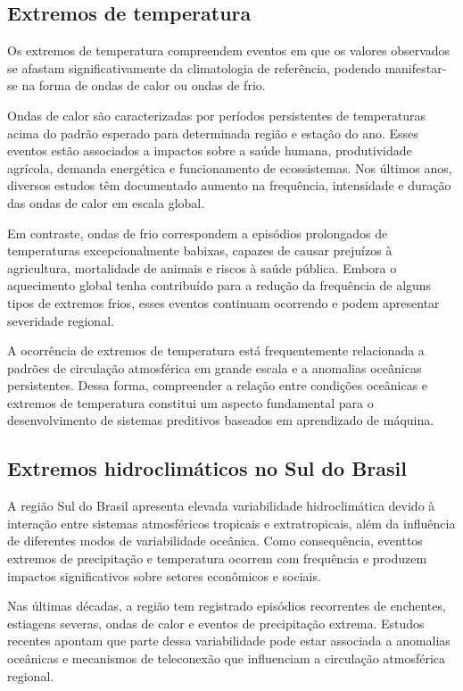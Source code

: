 \subsection{Extremos de temperatura}\label{sec:extremos-temperatura}
	
	Os extremos de temperatura compreendem eventos em que os valores observados se afastam significativamente da climatologia de referência, podendo manifestar-se na forma de ondas de calor ou ondas de frio.

	Ondas de calor são caracterizadas por períodos persistentes de temperaturas acima do padrão esperado para determinada região e estação do ano. Esses eventos estão associados a impactos sobre a saúde humana, produtividade agrícola, demanda energética e funcionamento de ecossistemas.
	Nos últimos anos, diversos estudos têm documentado aumento na frequência, intensidade e duração das ondas de calor em escala global.

	Em contraste, ondas de frio correspondem a episódios prolongados de temperaturas excepcionalmente babixas, capazes de causar prejuízos à agricultura, mortalidade de animais e riscos à saúde pública.
	Embora o aquecimento global tenha contribuído para a redução da frequência de alguns tipos de extremos frios, esses eventos continuam ocorrendo e podem apresentar severidade regional.

	A ocorrência de extremos de temperatura está frequentemente relacionada a padrões de circulação atmosférica em grande escala e a anomalias oceânicas persistentes.
	Dessa forma, compreender a relação entre condições oceânicas e extremos de temperatura constitui um aspecto fundamental para o desenvolvimento de sistemas preditivos baseados em aprendizado de máquina.

\subsection{Extremos hidroclimáticos no Sul do Brasil}\label{sec:extremos-hidroclimaticos-sul-brasil}

	A região Sul do Brasil apresenta elevada variabilidade hidroclimática devido à interação entre sistemas atmosféricos tropicais e extratropicais, além da influência de diferentes modos de variabilidade oceânica.
	Como consequência, eventtos extremos de precipitação e temperatura ocorrem com frequência e produzem impactos significativos sobre setores econômicos e sociais.

	Nas últimas décadas, a região tem registrado episódios recorrentes de enchentes, estiagens severas, ondas de calor e eventos de precipitação extrema.
	Estudos recentes apontam que parte dessa variabilidade pode estar associada a anomalias oceânicas e mecanismos de teleconexão que influenciam a circulação atmosférica regional.

